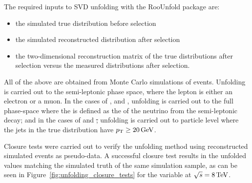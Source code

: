 

The required inputs to SVD unfolding with the RooUnfold package are:
\begin{itemize}
	\item the simulated true distribution before selection
	\item the simulated reconstructed distribution after selection
	\item the two-dimensional reconstruction matrix	of the true distributions after selection versus the
	measured distributions after selection.
\end{itemize}

All of the above are obtained from Monte Carlo simulations of \ttbar events. Unfolding is carried out to the
semi-leptonic phase space, where the lepton is either an electron or a muon. In the cases of \met, \wpt and
\mt, unfolding is carried out to the full phase-space where the \met is defined as the \pt of the neutrino
from the semi-leptonic decay; and in the cases of \HT and \st, unfolding is carried out to particle level
where the jets in the true distribution have $p_{\mathrm{T}}\geq20\,\text{Ge\hspace{-.08em}V}$.

Closure tests were carried out to verify the unfolding method using reconstructed simulated events as
pseudo-data. A successful closure test results in the unfolded values matching the simulated truth of the same
simulation sample, as can be seen in Figure~\ref{fig:unfolding_closure_tests} for the \met variable at
$\sqrt{s}=8\,\text{Te\hspace{-.08em}V}$.

